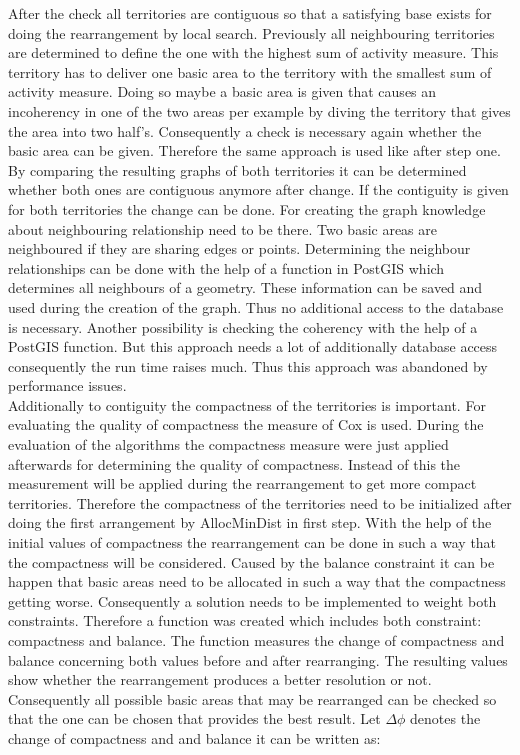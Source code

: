 After the check all territories are contiguous so that a satisfying base exists for doing the rearrangement by local search. Previously all neighbouring territories are determined to define the one with the highest sum of activity measure. This territory has to deliver one basic area to the territory with the smallest sum of activity measure. Doing so maybe a basic area is given that causes an incoherency in one of the two areas per example by diving the territory that gives the area into two half's. Consequently a check is necessary again whether the basic area can be given. Therefore the same approach is used like after step one. By comparing the resulting graphs of both territories it can be determined whether both ones are contiguous anymore after change. If the contiguity is given for both territories the change can be done. For creating the graph knowledge about neighbouring relationship need to be there. Two basic areas are neighboured if they are sharing edges or points. Determining the neighbour relationships can be done with the help of a function in PostGIS which determines all neighbours of a geometry. These information can be saved and used during the creation of the graph. Thus no additional access to the database is necessary. Another possibility is checking the coherency with the help of a PostGIS function. But this approach needs a lot of additionally database access consequently the run time raises much. Thus this approach was abandoned by performance issues. \\
Additionally to contiguity the compactness of the territories is important. For evaluating the quality of compactness the measure of Cox is used. During the evaluation of the algorithms the compactness measure were just applied afterwards for determining the quality of compactness. Instead of this the measurement will be applied during the rearrangement to get more compact territories. Therefore the compactness of the territories need to be initialized after doing the first arrangement by AllocMinDist in first step. With the help of the initial values of compactness the rearrangement can be done in such a way that the compactness will be considered. Caused by the balance constraint it can be happen that basic areas need to be allocated in such a way that the compactness getting worse. Consequently a solution needs to be implemented to weight both constraints. Therefore a function was created which includes both constraint: compactness and balance. The function measures the change of compactness and balance concerning both values before and after rearranging. The resulting values show whether the rearrangement produces a better resolution or not. Consequently all possible basic areas that may be rearranged can be checked so that the one can be chosen that provides the best result. Let $\Delta \phi $ denotes the change of compactness and and balance it can be written as:


